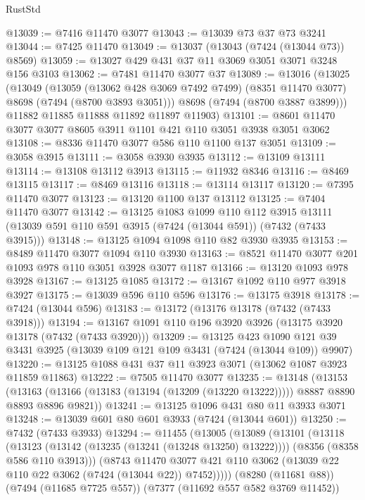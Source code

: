 \begin{lexlean}{RustStd}
\begin{coremodule}
@13039 := @7416 @11470 @3077
@13043 := @13039 @73 @37 @73 @3241
@13044 := @7425 @11470
@13049 := @13037 (@13043 (@7424 (@13044 @73)) @8569)
@13059 := @13027 @429 @431 @37 @11 @3069 @3051 @3071 @3248 @156 @3103
@13062 := @7481 @11470 @3077 @37
@13089 := @13016
    (@13025
      (@13049
        (@13059
          (@13062 @428 @3069 @7492 @7499)
          (@8351 @11470 @3077)
          @8698
          (@7494 (@8700 @3893 @3051)))
        @8698
        (@7494 (@8700 @3887 @3899)))
      @11882
      @11885
      @11888
      @11892
      @11897
      @11903)
@13101 := @8601 @11470 @3077 @3077 @8605 @3911 @1101 @421 @110 @3051 @3938 @3051 @3062
@13108 := @8336 @11470 @3077 @586 @110 @1100 @137 @3051
@13109 := @3058 @3915
@13111 := @3058 @3930 @3935
@13112 := @13109 @13111
@13114 := @13108 @13112 @3913
@13115 := @11932 @8346
@13116 := @8469 @13115
@13117 := @8469 @13116
@13118 := @13114 @13117
@13120 := @7395 @11470 @3077
@13123 := @13120 @1100 @137 @13112
@13125 := @7404 @11470 @3077
@13142 := @13125
    @1083
    @1099
    @110
    @112
    @3915
    @13111
    (@13039 @591 @110 @591 @3915 (@7424 (@13044 @591)) (@7432 (@7433 @3915)))
@13148 := @13125 @1094 @1098 @110 @82 @3930 @3935
@13153 := @8489 @11470 @3077 @1094 @110 @3930
@13163 := @8521 @11470 @3077 @201 @1093 @978 @110 @3051 @3928 @3077 @1187
@13166 := @13120 @1093 @978 @3928
@13167 := @13125 @1085
@13172 := @13167 @1092 @110 @977 @3918 @3927
@13175 := @13039 @596 @110 @596
@13176 := @13175 @3918
@13178 := @7424 (@13044 @596)
@13183 := @13172 (@13176 @13178 (@7432 (@7433 @3918)))
@13194 := @13167 @1091 @110 @196 @3920 @3926 (@13175 @3920 @13178 (@7432 (@7433 @3920)))
@13209 := @13125
    @423
    @1090
    @121
    @39
    @3431
    @3925
    (@13039 @109 @121 @109 @3431 (@7424 (@13044 @109)) @9907)
@13220 := @13125 @1088 @431 @37 @11 @3923 @3071 (@13062 @1087 @3923 @11859 @11863)
@13222 := @7505 @11470 @3077
@13235 := @13148
    (@13153
      (@13163 (@13166 (@13183 (@13194 (@13209 (@13220 @13222))))) @8887 @8890 @8893 @8896 @9821))
@13241 := @13125 @1096 @431 @80 @11 @3933 @3071
@13248 := @13039 @601 @80 @601 @3933 (@7424 (@13044 @601))
@13250 := @7432 (@7433 @3933)
@13294 := @11455
    (@13005
      (@13089
        (@13101
          (@13118
            (@13123 (@13142 (@13235 (@13241 (@13248 @13250) @13222))))
            (@8356 (@8358 @586 @110 @3913)))
          (@8743
            @11470
            @3077
            @421
            @110
            @3062
            (@13039 @22 @110 @22 @3062 (@7424 (@13044 @22)) @7452)))))
    (@8280 (@11681 @88))
    (@7494 (@11685 @7725 @557))
    (@7377 (@11692 @557 @582 @3769 @11452))

\end{coremodule}
\end{lexlean}
